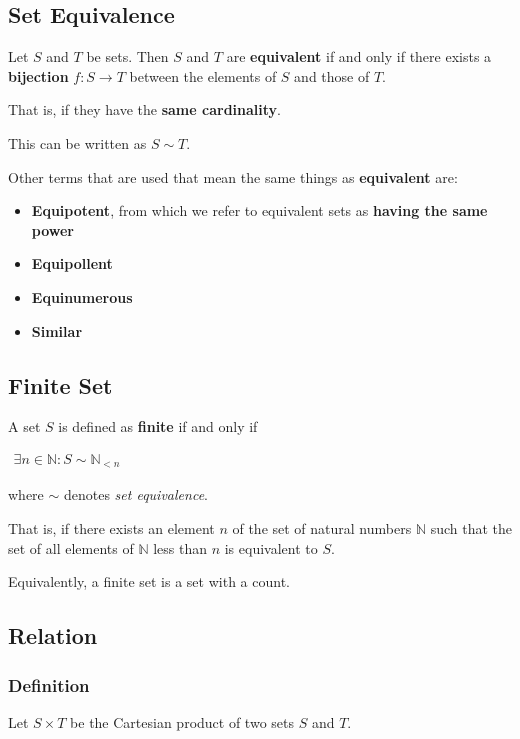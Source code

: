 \subsection{Set Equivalence}
\label{sec:set-eq}

Let $S$ and $T$ be sets. Then $S$ and $T$ are \textbf{equivalent} if
and only if there exists a \textbf{bijection} $f : S \to T$ between
the elements of $S$ and those of $T$.

That is, if they have the \textbf{same cardinality}.

This can be written as $S \sim T$.

Other terms that are used that mean the same things as
\textbf{equivalent} are:

\begin{itemize}
\item \textbf{Equipotent}, from which we refer to equivalent sets as
  \textbf{having the same power}
\item \textbf{Equipollent}
\item \textbf{Equinumerous}
\item \textbf{Similar}
\end{itemize}

\subsection{Finite Set}
\label{sec:finite-set}

A set $S$ is defined as \textbf{finite} if and only if

\begin{math}
  \begin{array}{c}
    \exists n \in \mathbb{N}: S \sim \mathbb{N}_{< n}
  \end{array}
\end{math}

where $\sim$ denotes \textit{set equivalence}.

That is, if there exists an element $n$ of the set of natural numbers
$\mathbb{N}$ such that the set of all elements of $\mathbb{N}$ less
than $n$ is equivalent to $S$.

Equivalently, a finite set is a set with a count.



\subsection{Relation}
\subsubsection{Definition}
Let $S \times T$ be the Cartesian product of two sets $S$ and $T$.

